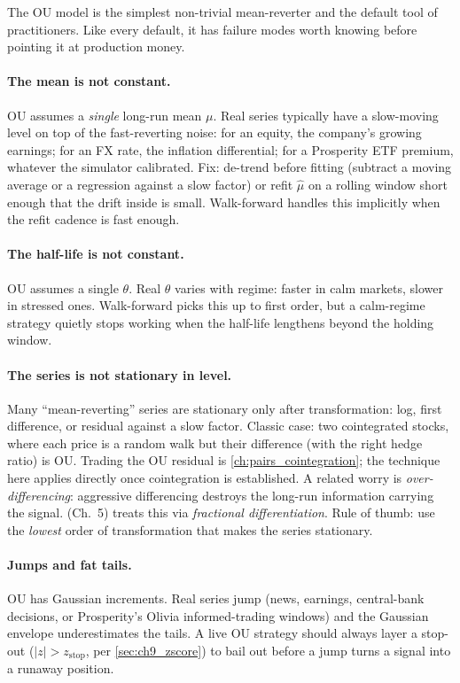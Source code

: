 The OU model is the simplest non-trivial mean-reverter and the
default tool of practitioners. Like every default, it has
failure modes worth knowing before pointing it at production
money.

\paragraph{The mean is not constant.} OU assumes a \emph{single}
long-run mean $\mu$. Real series typically have a slow-moving
level on top of the fast-reverting noise: for an equity, the
company's growing earnings; for an FX rate, the inflation
differential; for a Prosperity ETF premium, whatever the
simulator calibrated. Fix: de-trend before fitting (subtract a
moving average or a regression against a slow factor) or refit
$\hat\mu$ on a rolling window short enough that the drift inside
is small. Walk-forward handles this implicitly when the refit
cadence is fast enough.

\paragraph{The half-life is not constant.} OU assumes a single
$\theta$. Real $\theta$ varies with regime: faster in calm
markets, slower in stressed ones. Walk-forward picks this up to
first order, but a calm-regime strategy quietly stops working
when the half-life lengthens beyond the holding window.

\paragraph{The series is not stationary in level.} Many
``mean-reverting'' series are stationary only after
transformation: log, first difference, or residual against a
slow factor. Classic case: two cointegrated stocks, where each
price is a random walk but their difference (with the right
hedge ratio) is OU. Trading the OU residual is
\cref{ch:pairs_cointegration}; the technique here applies
directly once cointegration is established. A related worry is
\emph{over-differencing}: aggressive differencing destroys the
long-run information carrying the signal. \citeAFML{} (Ch.~5)
treats this via \emph{fractional differentiation}. Rule of
thumb: use the \emph{lowest} order of transformation that makes
the series stationary.

\paragraph{Jumps and fat tails.} OU has Gaussian increments.
Real series jump (news, earnings, central-bank decisions, or
Prosperity's Olivia informed-trading windows) and the Gaussian
envelope underestimates the tails. A live OU strategy should
always layer a stop-out ($|z| > z_{\text{stop}}$, per
\cref{sec:ch9_zscore}) to bail out before a jump turns a signal
into a runaway position.


